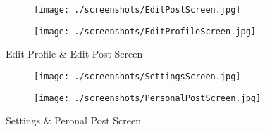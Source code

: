     \begin{figure}
      \centering
      \begin{subfigure}{.5\textwidth}
        \centering
        \texttt{[image: ./screenshots/EditPostScreen.jpg]}
        \label{fig:sub1}
      \end{subfigure}%
      \begin{subfigure}{.5\textwidth}
        \centering
        \texttt{[image: ./screenshots/EditProfileScreen.jpg]}
        \label{fig:sub2}
      \end{subfigure}
      \caption{Edit Profile \& Edit Post Screen}
      \label{fig:test}
      \end{figure}

    \begin{figure}
      \centering
      \begin{subfigure}{.5\textwidth}
        \centering
        \texttt{[image: ./screenshots/SettingsScreen.jpg]}
        \label{fig:sub1}
      \end{subfigure}%
      \begin{subfigure}{.5\textwidth}
        \centering
        \texttt{[image: ./screenshots/PersonalPostScreen.jpg]}
        \label{fig:sub2}
      \end{subfigure}
      \caption{Settings \& Peronal Post Screen}
      \label{fig:test}
      \end{figure}